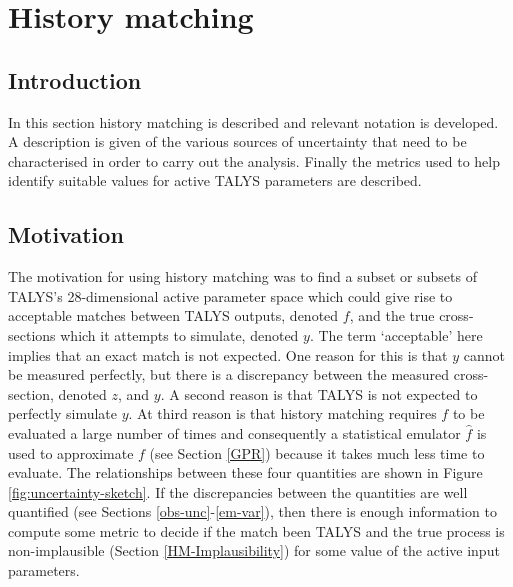 \documentclass[
  12pt,
  a4paper,
  twoside]{book}
\begin{document}
\hypertarget{History-Matching}{%
\chapter{History matching}\label{History-Matching}}

\hypertarget{HM-Intro}{%
\section{Introduction}\label{HM-Intro}}

In this section history matching is described and relevant notation is developed. A description is given of the various sources of uncertainty that need to be characterised in order to carry out the analysis. Finally the metrics used to help identify suitable values for active TALYS parameters are described.

\hypertarget{motivation}{%
\section{Motivation}\label{motivation}}

The motivation for using history matching was to find a subset or subsets of TALYS's 28-dimensional active parameter space which could give rise to acceptable matches between TALYS outputs, denoted \(f\), and the true cross-sections which it attempts to simulate, denoted \(y\). The term `acceptable' here implies that an exact match is not expected. One reason for this is that \(y\) cannot be measured perfectly, but there is a discrepancy between the measured cross-section, denoted \(z\), and \(y\). A second reason is that TALYS is not expected to perfectly simulate \(y\). At third reason is that history matching requires \(f\) to be evaluated a large number of times and consequently a statistical emulator \(\hat{f}\) is used to approximate \(f\) (see Section \ref{GPR}) because it takes much less time to evaluate. The relationships between these four quantities are shown in Figure \ref{fig:uncertainty-sketch}. If the discrepancies between the quantities are well quantified (see Sections \ref{obs-unc}-\ref{em-var}), then there is enough information to compute some metric to decide if the match been TALYS and the true process is non-implausible (Section \ref{HM-Implausibility}) for some value of the active input parameters.
\end{document}
